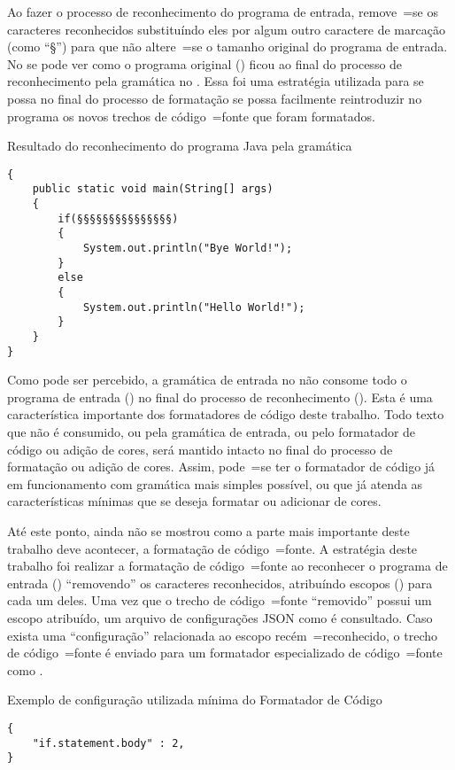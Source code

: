 Ao fazer o processo de reconhecimento do programa de entrada,
remove~=se os caracteres reconhecidos substituíndo eles por algum outro caractere de marcação (como ``§'') para que não altere~=se o tamanho original do programa de entrada.
No  se pode ver como o programa original () ficou ao final do processo de reconhecimento pela gramática no .
Essa foi uma estratégia utilizada para se possa no final do processo de formatação se possa facilmente reintroduzir no programa os novos trechos de código~=fonte que foram formatados.
\begin{code}
\caption{Resultado do reconhecimento do programa Java pela gramática}
\label{code:resultadoDoReconhecimentoDoProgramaJava}
\begin{verbatim}
{
    public static void main(String[] args)
    {
        if(§§§§§§§§§§§§§§§)
        {
            System.out.println("Bye World!");
        }
        else
        {
            System.out.println("Hello World!");
        }
    }
}
\end{verbatim}
\end{code}

Como pode ser percebido,
a gramática de entrada no  não consome todo o programa de entrada () no final do processo de reconhecimento ().
Esta é uma característica importante dos formatadores de código deste trabalho.
Todo texto que não é consumido,
ou pela gramática de entrada,
ou pelo formatador de código ou
adição de cores,
será mantido intacto no final do processo de formatação ou
adição de cores.
Assim,
pode~=se ter o formatador de código já em funcionamento com gramática mais simples possível,
ou que já atenda as características mínimas que se deseja formatar ou
adicionar de cores.

Até este ponto,
ainda não se mostrou como a parte mais importante deste trabalho deve acontecer,
a formatação de código~=fonte.
A estratégia deste trabalho foi realizar a formatação de código~=fonte ao reconhecer o programa de entrada () ``removendo'' os caracteres reconhecidos,
atribuíndo escopos () para cada um deles.
Uma vez que o trecho de código~=fonte ``removido'' possui um escopo atribuído,
um arquivo de configurações JSON como  é consultado.
Caso exista uma ``configuração'' relacionada ao escopo recém~=reconhecido,
o trecho de código~=fonte é enviado para um formatador especializado de código~=fonte como .
\begin{code}
\caption{Exemplo de configuração utilizada mínima do Formatador de Código}
\label{code:exemploDeConfiguracaoUtilizadaMinimaDoFormatadorDeCodigo}
\begin{verbatim}
{
    "if.statement.body" : 2,
}
\end{verbatim}
\end{code}

